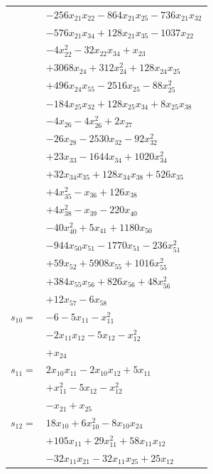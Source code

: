 \begin{longtable}{@{}r@{\;}l@{}}
 & \(\displaystyle -256x_{21}x_{22} -864x_{21}x_{25} -736x_{21}x_{32}\) \\
 & \(\displaystyle -576x_{21}x_{34} +128x_{21}x_{35} -1037x_{22}\) \\
 & \(\displaystyle -4x_{22}^{2} -32x_{22}x_{34} +x_{23}\) \\
 & \(\displaystyle +3068x_{24} +312x_{24}^{2} +128x_{24}x_{25}\) \\
 & \(\displaystyle +496x_{24}x_{55} -2516x_{25} -88x_{25}^{2}\) \\
 & \(\displaystyle -184x_{25}x_{32} +128x_{25}x_{34} +8x_{25}x_{38}\) \\
 & \(\displaystyle -4x_{26} -4x_{26}^{2} +2x_{27}\) \\
 & \(\displaystyle -26x_{28} -2530x_{32} -92x_{32}^{2}\) \\
 & \(\displaystyle +23x_{33} -1644x_{34} +1020x_{34}^{2}\) \\
 & \(\displaystyle +32x_{34}x_{35} +128x_{34}x_{38} +526x_{35}\) \\
 & \(\displaystyle +4x_{35}^{2} -x_{36} +126x_{38}\) \\
 & \(\displaystyle +4x_{38}^{2} -x_{39} -220x_{40}\) \\
 & \(\displaystyle -40x_{40}^{2} +5x_{41} +1180x_{50}\) \\
 & \(\displaystyle -944x_{50}x_{51} -1770x_{51} -236x_{51}^{2}\) \\
 & \(\displaystyle +59x_{52} +5908x_{55} +1016x_{55}^{2}\) \\
 & \(\displaystyle +384x_{55}x_{56} +826x_{56} +48x_{56}^{2}\) \\
 & \(\displaystyle +12x_{57} -6x_{58}\) \\[3pt]
\(s_{10}=\) & \(\displaystyle -6 -5x_{11} -x_{11}^{2}\) \\
 & \(\displaystyle -2x_{11}x_{12} -5x_{12} -x_{12}^{2}\) \\
 & \(\displaystyle +x_{24}\) \\[3pt]
\(s_{11}=\) & \(\displaystyle 2x_{10}x_{11} -2x_{10}x_{12} +5x_{11}\) \\
 & \(\displaystyle +x_{11}^{2} -5x_{12} -x_{12}^{2}\) \\
 & \(\displaystyle -x_{21} +x_{25}\) \\[3pt]
\(s_{12}=\) & \(\displaystyle 18x_{10} +6x_{10}^{2} -8x_{10}x_{24}\) \\
 & \(\displaystyle +105x_{11} +29x_{11}^{2} +58x_{11}x_{12}\) \\
 & \(\displaystyle -32x_{11}x_{21} -32x_{11}x_{25} +25x_{12}\) \\

\end{longtable}
